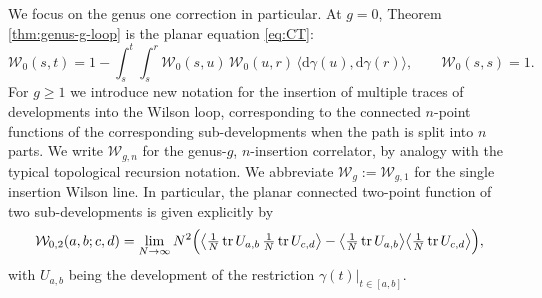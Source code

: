 \documentclass[11pt,a4paper]{article}
\DeclareMathOperator{\tr}{tr}
\newcommand{\cW}{\mathcal{W}}
\begin{document}
We focus on the genus one correction in particular. At $g=0$, Theorem \ref{thm:genus-g-loop} is the planar equation \eqref{eq:CT}:
\begin{equation}\label{eq:W0-int}
  \cW_0(s,t) = 1 - \int_s^t\!\!\int_s^r \cW_0(s,u)\,\cW_0(u,r)\,\langle\mathrm d\gamma(u),\mathrm d\gamma(r)\rangle,
  \qquad \cW_0(s,s)=1.
\end{equation}
%
For $g\ge 1$ we introduce new notation for the insertion of multiple traces of developments into the Wilson loop, corresponding to the  connected $n$-point functions of the corresponding sub-developments when the path is split into $n$ parts. We write $\cW_{g,n}$ for the genus-$g$, $n$-insertion correlator, by analogy with the typical topological recursion notation. We abbreviate $\cW_g:=\cW_{g,1}$ for the single insertion Wilson line. In particular, the planar connected two-point function of two sub-developments is given explicitly by
%
\begin{equation}\label{eq:W2-def}
  \cW_{0,2}(a,b;c,d) = \lim_{N\to\infty} N^2\Bigl(\bigl\langle\tfrac1N\tr U_{a,b}\,\tfrac1N\tr U_{c,d}\bigr\rangle - \bigl\langle\tfrac1N\tr U_{a,b}\bigr\rangle\bigl\langle\tfrac1N\tr U_{c,d}\bigr\rangle\Bigr),
\end{equation}
with $U_{a,b}$ being the development of the restriction $\gamma(t)|_{t\in[a,b]}$.
\end{document}
